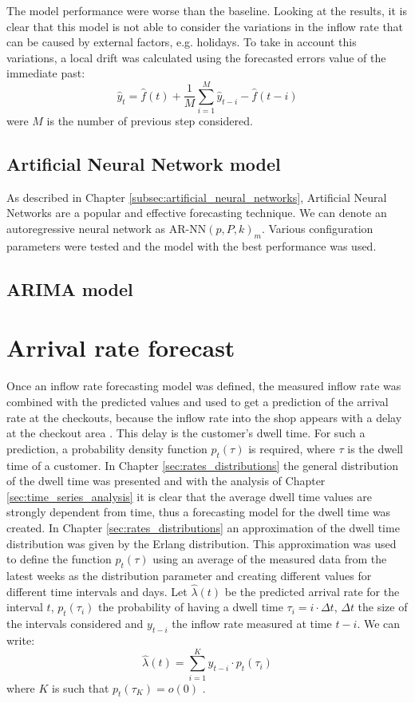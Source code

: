 The model performance were worse than the baseline. Looking at the results, it is clear that this model is not able to consider the variations in the inflow rate that can be caused by external factors, e.g. holidays. To take in account this variations, a local drift was calculated using the forecasted errors value of the immediate past:
\[ \hat{y}_t = \hat{f}(t) + \frac{1}{M} \sum_{i=1}^{M} \hat{y}_{t-i} - \hat{f}(t-i) \]
were \(M\) is the number of previous step considered.

\subsection{Artificial Neural Network model}
\label{subsec:ann_model}
As described in Chapter \ref{subsec:artificial_neural_networks}, Artificial Neural Networks are a popular and effective forecasting technique. We can denote an autoregressive neural network as \( \text{AR-NN}(p, P, k)_m \). Various configuration parameters were tested and the model with the best performance was used.

\subsection{ARIMA model}
\label{subsec:arima_model}

\section{Arrival rate forecast}
\label{sec:arrival_rate_forecast}
Once an inflow rate forecasting model was defined, the measured inflow rate was combined with the predicted values and used to get a prediction of the arrival rate at the checkouts, because the inflow rate into the shop appears with a delay at the checkout area \cite{aksu}. This delay is the customer's dwell time. For such a prediction, a probability density function \( p_t(\tau) \) is required, where \( \tau \) is the dwell time of a customer.
In Chapter \ref{sec:rates_distributions} the general distribution of the dwell time was presented and with the analysis of Chapter \ref{sec:time_series_analysis} it is clear that the average dwell time values are strongly dependent from time, thus a forecasting model for the dwell time was created.
In Chapter \ref{sec:rates_distributions} an approximation of the dwell time distribution was given by the Erlang distribution. This approximation was used to define the function \( p_t(\tau) \) using an average of the measured data from the latest weeks as the distribution parameter and creating different values for different time intervals and days.
Let \( \hat{\lambda}(t) \) be the predicted arrival rate for the interval \( t \), \( p_t(\tau_i) \) the probability of having a dwell time \( \tau_i = i \cdot \Delta t \), \( \Delta t \) the size of the intervals considered and \( y_{t-i} \) the inflow rate measured at time \( t-i \). We can write:
\[ \hat{\lambda}(t) = \sum_{i=1}^{K} y_{t-i} \cdot p_t(\tau_i) \]
where \( K \) is such that \( p_t(\tau_K) = o(0) \) .

